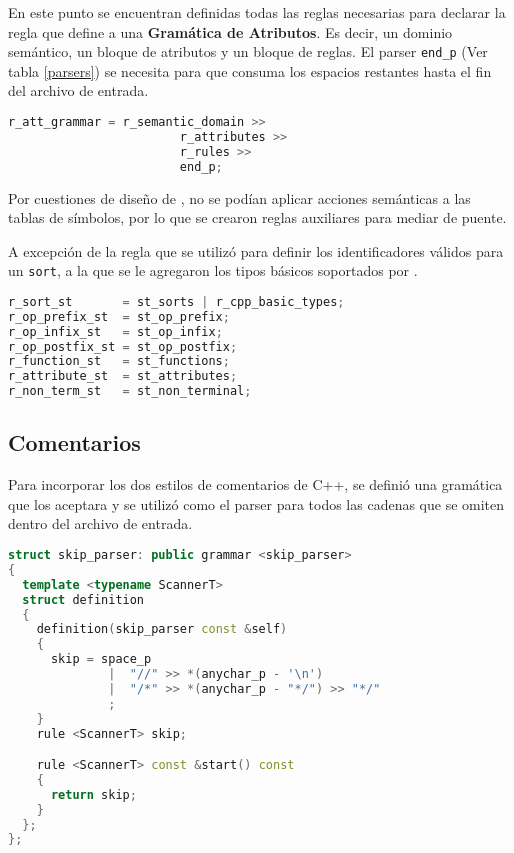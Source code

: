En este punto se encuentran definidas todas las reglas necesarias para declarar la regla que define a una \textbf{Gramática de Atributos}. Es decir, un dominio semántico, un bloque de atributos y un bloque de reglas. El parser \texttt{end\_p} (Ver tabla \ref{parsers}) se necesita para que consuma los espacios restantes hasta el fin del archivo de entrada.

\begin{lstlisting}[language=C++, basicstyle=\scriptsize, columns=fullflexible, linewidth=7cm]
r_att_grammar = r_semantic_domain >>
                        r_attributes >>
                        r_rules >>
                        end_p;
\end{lstlisting}

Por cuestiones de diseño de \spirit, no se podían aplicar acciones semánticas a las tablas de símbolos, por lo que se crearon reglas auxiliares para mediar de puente.

A excepción de la regla que se utilizó para definir los identificadores válidos para un \texttt{sort}, a la que se le agregaron los tipos básicos soportados por \maggen.

\begin{lstlisting}[language=C++, basicstyle=\scriptsize, linewidth=9cm]
r_sort_st       = st_sorts | r_cpp_basic_types;
r_op_prefix_st  = st_op_prefix;
r_op_infix_st   = st_op_infix;
r_op_postfix_st = st_op_postfix;
r_function_st   = st_functions;
r_attribute_st  = st_attributes;
r_non_term_st   = st_non_terminal;
\end{lstlisting}

\subsection{Comentarios}

Para incorporar los dos estilos de comentarios de C++, se definió una gramática que los aceptara y se utilizó como el parser para todos las cadenas que se omiten dentro del archivo de entrada.

\begin{lstlisting}[language=C++, basicstyle=\scriptsize, columns=fullflexible, linewidth=8cm]
struct skip_parser: public grammar <skip_parser>
{
  template <typename ScannerT>
  struct definition
  {
    definition(skip_parser const &self)
    {
      skip = space_p
              |  "//" >> *(anychar_p - '\n')
              |  "/*" >> *(anychar_p - "*/") >> "*/"
              ;
    }
    rule <ScannerT> skip;

    rule <ScannerT> const &start() const
    {
      return skip;
    }
  };
};
\end{lstlisting}

